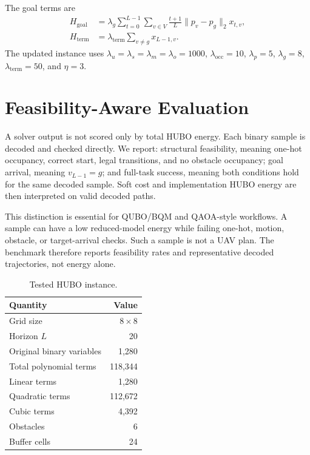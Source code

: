 \documentclass[letterpaper]{article} %
\begin{document}
The goal terms are
\begin{align}
H_{\mathrm{goal}} &= \lambda_g\sum_{t=0}^{L-1}\sum_{v\in V}\frac{t+1}{L}\|p_v-p_g\|_2x_{t,v},\\
H_{\mathrm{term}} &= \lambda_{\mathrm{term}}\sum_{v\ne g}x_{L-1,v}.
\end{align}
The updated instance uses $\lambda_u=\lambda_s=\lambda_m=\lambda_o=1000$, $\lambda_{\mathrm{occ}}=10$, $\lambda_p=5$, $\lambda_g=8$, $\lambda_{\mathrm{term}}=50$, and $\eta=3$.

\section{Feasibility-Aware Evaluation}
A solver output is not scored only by total HUBO energy. Each binary sample is decoded and checked directly. We report: structural feasibility, meaning one-hot occupancy, correct start, legal transitions, and no obstacle occupancy; goal arrival, meaning $v_{L-1}=g$; and full-task success, meaning both conditions hold for the same decoded sample. Soft cost and implementation HUBO energy are then interpreted on valid decoded paths.

This distinction is essential for QUBO/BQM and QAOA-style workflows. A sample can have a low reduced-model energy while failing one-hot, motion, obstacle, or target-arrival checks. Such a sample is not a UAV plan. The benchmark therefore reports feasibility rates and representative decoded trajectories, not energy alone.

\begin{table}[t]
\centering
\begin{tabular}{lr}
\toprule
Quantity & Value\\
\midrule
Grid size & $8\times 8$\\
Horizon $L$ & 20\\
Original binary variables & 1,280\\
Total polynomial terms & 118,344\\
Linear terms & 1,280\\
Quadratic terms & 112,672\\
Cubic terms & 4,392\\
Obstacles & 6\\
Buffer cells & 24\\
\bottomrule
\end{tabular}
\caption{Tested HUBO instance.}
\label{tab:instance}
\end{table}
\end{document}
